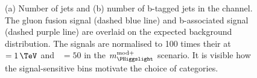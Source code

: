 \begin{figure}[h!]
\begin{center}
\end{center}
\caption[Number of jets and number of b-tagged jets in the \mutau channel, 
with the signal overlaid.]{(a) Number of jets and (b) number of b-tagged jets in the \mutau channel. The gluon fusion signal (dashed
blue line) and b-associated signal (dashed purple line) are overlaid on the expected background distribution. The signals
are normalised to 100 times their \xsbr at \mA~$=1\,\TeV$ and \tanb~$=50$ in the $m_{\PHiggslight}^{\text{mod+}}$
scenario. It is visible how the signal-sensitive bins motivate the choice of categories.}
\label{fig:mssm_cats_mt}
\end{figure}

